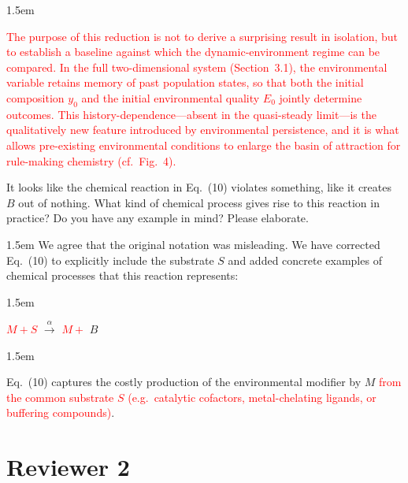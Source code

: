 \documentclass[11pt]{article}
\newcommand{\rev}[1]{\textcolor{red}{#1}}
\newcommand{\RC}[1]{\medskip\noindent #1\par}
\newenvironment{response}{\medskip\begin{adjustwidth}{1.5em}{}\color{blue}\mdseries\sloppy}{\end{adjustwidth}\color{black}}
\newenvironment{manuscript}{%
  \begin{adjustwidth}{1.5em}{}%
  \begin{mdframed}[
    topline=false, bottomline=false, rightline=false,
    linewidth=2pt, linecolor=red,
    innerleftmargin=1em, innerrightmargin=0pt,
    innertopmargin=0.4em, innerbottommargin=0.4em,
    skipabove=\medskipamount, skipbelow=\medskipamount
  ]\color{black}%
}{%
  \end{mdframed}%
  \end{adjustwidth}%
}
\begin{document}
\begin{manuscript}\rev{The purpose of this reduction is not to derive a surprising result in isolation, but to establish a baseline against which the dynamic-environment regime can be compared. In the full two-dimensional system (Section~3.1), the environmental variable retains memory of past population states, so that both the initial composition $y_0$ and the initial environmental quality $E_0$ jointly determine outcomes. This history-dependence---absent in the quasi-steady limit---is the qualitatively new feature introduced by environmental persistence, and it is what allows pre-existing environmental conditions to enlarge the basin of attraction for rule-making chemistry (cf.\ Fig.~4).}
\end{manuscript}

\RC{It looks like the chemical reaction in Eq.~(10) violates something, like it creates $B$ out of nothing. What kind of chemical process gives rise to this reaction in practice? Do you have any example in mind? Please elaborate.}

\begin{response}
We agree that the original notation was misleading. We have corrected Eq.~(10) to explicitly include the substrate $S$ and added concrete examples of chemical processes that this reaction represents:
\end{response}

\begin{manuscript}
\rev{$M + S$} $\xrightarrow{\alpha}$ \rev{$M +$} $B$
\end{manuscript}

\begin{manuscript}
Eq.~(10) captures the costly production of the environmental modifier by $M$ \rev{from the common substrate $S$ (e.g.\ catalytic cofactors, metal-chelating ligands, or buffering compounds)}.
\end{manuscript}

\clearpage
\section*{Reviewer 2}
\end{document}

